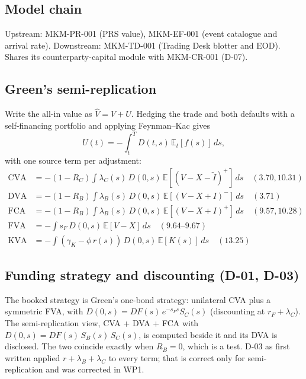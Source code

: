 \documentclass[11pt,a4paper]{article}
\begin{document}
\subsection{Model chain}
Upstream: MKM-PR-001 (PRS value), MKM-EF-001 (event catalogue and arrival
rate). Downstream: MKM-TD-001 (Trading Desk blotter and EOD). Shares its
counterparty-capital module with MKM-CR-001 (D-07).

\mkmframework

\subsection{Green's semi-replication}
Write the all-in value as $\hat V = V + U$. Hedging the trade and both
defaults with a self-financing portfolio and applying Feynman--Kac gives
\begin{equation}
U(t) = -\int_t^T D(t,s)\,\mathbb{E}_t[f(s)]\,ds ,
\end{equation}
with one source term per adjustment:
\begin{align}
\mathrm{CVA} &= -(1-R_C)\int \lambda_C(s)\, D(0,s)\, \mathbb{E}[(V-X-\tilde I)^+]\,ds \quad(3.70, 10.31)\\
\mathrm{DVA} &= -(1-R_B)\int \lambda_B(s)\, D(0,s)\, \mathbb{E}[(V-X+I)^-]\,ds \quad(3.71)\\
\mathrm{FCA} &= -(1-R_B)\int \lambda_B(s)\, D(0,s)\, \mathbb{E}[(V-X+I)^+]\,ds \quad(9.57, 10.28)\\
\mathrm{FVA} &= -\int s_F\, D(0,s)\, \mathbb{E}[V-X]\,ds \quad(9.64\text{--}9.67)\\
\mathrm{KVA} &= -\int (\gamma_K - \phi\, r(s))\, D(0,s)\, \mathbb{E}[K(s)]\,ds \quad(13.25)
\end{align}

\subsection{Funding strategy and discounting (D-01, D-03)}
The booked strategy is Green's one-bond strategy: unilateral CVA plus a
symmetric FVA, with $D(0,s) = DF(s)\,e^{-s_F s} S_C(s)$ (discounting at
$r_F + \lambda_C$). The semi-replication view, CVA + DVA + FCA with
$D(0,s) = DF(s)\,S_B(s)\,S_C(s)$, is computed beside it and its DVA is
disclosed. The two coincide exactly when $R_B = 0$, which is a test. D-03 as
first written applied $r+\lambda_B+\lambda_C$ to every term; that is correct
only for semi-replication and was corrected in WP1.
\end{document}

